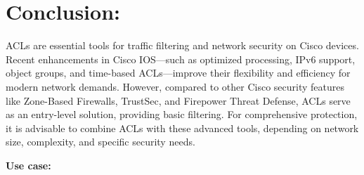 \documentclass[11pt,a4paper]{article}
\begin{document}
\section*{Conclusion:}
    ACLs are essential tools for traffic filtering and network security on Cisco devices. Recent enhancements in Cisco IOS—such as optimized processing, IPv6 support, object groups, and time-based ACLs—improve their flexibility and efficiency for modern network demands. However, compared to other Cisco security features like Zone-Based Firewalls, TrustSec, and Firepower Threat Defense, ACLs serve as an entry-level solution, providing basic filtering. For comprehensive protection, it is advisable to combine ACLs with these advanced tools, depending on network size, complexity, and specific security needs.

\newpage


                \textbf{Use case:} 




\newpage


\begin{multicols}{2}
    \small
    
    \makeatletter
  \renewcommand\@biblabel[1]{#1.} 
    
   
\end{multicols}
  
\end{document}
